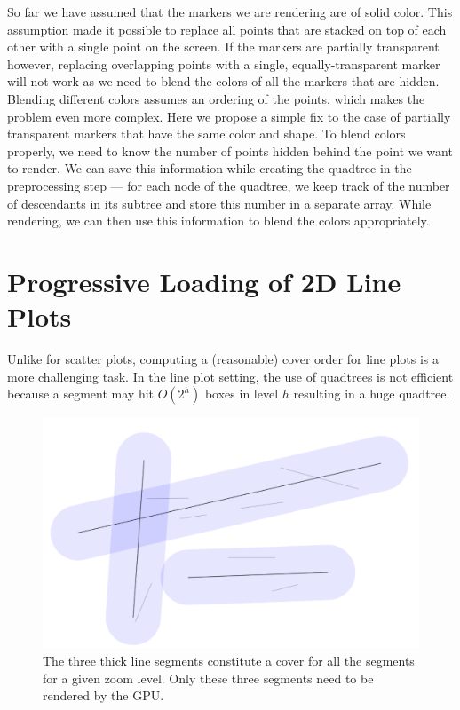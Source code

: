 \documentclass[11pt,a4paper]{article}
\begin{document}
So far we have assumed that the markers we are rendering are of solid color. 
This assumption made it possible to replace all points that are stacked on top of each other 
with a single point on the screen.
If the markers are partially transparent however, replacing overlapping points with a single, equally-transparent marker
will not work as we need to blend the colors of all the markers that are hidden. 
Blending different colors assumes an ordering of the points, which makes the problem even more complex.
Here we propose a simple fix to the case of partially transparent markers that have the same color and shape. 
To blend colors properly, we need to know the number of points hidden behind the point we want to render. 
We can save this information while creating the quadtree in the preprocessing step --- for each 
node of the quadtree, we keep track of the number of descendants in its subtree and 
store this number in a separate array. 
While rendering, we can then use this information to blend the colors appropriately. 




\section{Progressive Loading of 2D Line Plots}
Unlike for scatter plots, computing a (reasonable) cover order for line plots is a more challenging task.
In the line plot setting, the use of quadtrees is not efficient because a segment may hit $O(2^h)$ boxes in level $h$
resulting in a huge quadtree. 


\begin{figure}[hbt]
  \begin{center}
    \includegraphics[scale=0.15]{lineplot-cover.png}
    \caption{The three thick line segments constitute a cover for all the segments for a given zoom level. Only these three segments need to be rendered by the GPU.}
    \label{quad}
  \end{center}
\end{figure}
\end{document}
